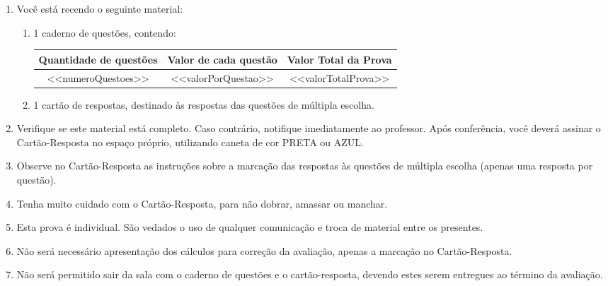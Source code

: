 \documentclass[12pt, a4paper]{article}
\begin{document}
    \begin{enumerate}[label=\bfseries\arabic*. , wide, labelwidth=!, labelindent=0pt, leftmargin=*]
        \item Você está recendo o seguinte material:
        \begin{enumerate}[label=\alph*)]
            \item 1 caderno de questões, contendo: \\
            
            \noindent %
            \begin{minipage}{\linewidth}
                \par\centering 
                \begingroup 
                \setlength{\extrarowheight}{3pt} 
                
                \begin{tabular}{|c|c|c|}
                    \hline
                    \rowcolor{lightgray} 
                    \textbf{Quantidade de questões} & \textbf{Valor de cada questão} & \textbf{Valor Total da Prova} \\
                    \hline
                    \rowcolor{white} 
                    <<numeroQuestoes>> & <<valorPorQuestao>> & <<valorTotalProva>> \\
                    \hline
                \end{tabular}
                \endgroup
            \end{minipage}
            \vspace{0.35cm}
            \item 1 cartão de respostas, destinado às respostas das questões de múltipla escolha.
        \end{enumerate}
        \item Verifique se este material está completo. Caso contrário, notifique imediatamente ao professor. 
        Após conferência, você deverá assinar o Cartão-Resposta no espaço próprio, utilizando caneta de cor PRETA ou AZUL.
        \item Observe no Cartão-Resposta as instruções sobre a marcação das respostas às questões de múltipla escolha (apenas uma resposta por questão).
        \item Tenha muito cuidado com o Cartão-Resposta, para não dobrar, amassar ou manchar.
        \item Esta prova é individual. São vedados o uso de qualquer comunicação e troca de material entre os presentes.
        \item Não será necessário apresentação dos cálculos para correção da avaliação, apenas a marcação no Cartão-Resposta.
        \item Não será permitido sair da sala com o caderno de questões e o cartão-resposta, devendo estes serem entregues ao término da avaliação.
    \end{enumerate}
    \vspace{0.5cm}
    \newpage
    
\end{document}
